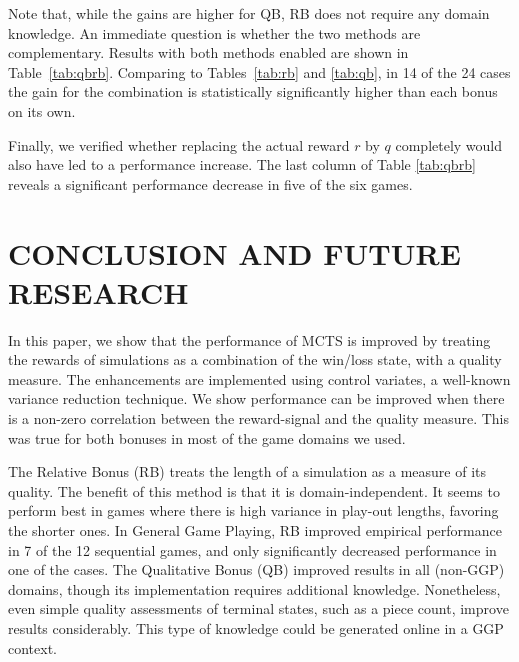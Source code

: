 \documentclass{ecai2014}
\begin{document}
Note that, while the gains are higher for QB, RB does not require any domain knowledge. An immediate question is whether the two methods are complementary. Results with both methods enabled are shown in Table~\ref{tab:qbrb}. Comparing to Tables~\ref{tab:rb} and \ref{tab:qb}, in 14 of the 24 cases the gain for the combination is statistically significantly higher than each bonus on its own. 

Finally, we verified whether replacing the actual reward $r$ by $q$ completely would also have led to a performance increase. The last column of Table \ref{tab:qbrb} reveals a significant performance decrease in five of the six games. 

\section{CONCLUSION AND FUTURE RESEARCH}
\label{sec:concl}
In this paper, we show that the performance of MCTS is improved by treating the rewards of simulations as a combination of the win/loss state, with a quality measure. The enhancements are implemented using control variates, a well-known variance reduction technique. We show performance can be improved when there is a non-zero correlation between the reward-signal and the quality measure. This was true for both bonuses in most of the game domains we used. 

The Relative Bonus (RB) treats the length of a simulation as a measure of its quality. The benefit of this method is that it is domain-independent. It seems to perform best in games where there is high variance in play-out lengths, favoring the shorter ones. 
In General Game Playing, RB improved empirical performance in 7 of the 12 sequential games, 
and only significantly decreased performance in one of the cases. 
The Qualitative Bonus (QB) improved results in all (non-GGP) domains, though its implementation requires additional knowledge. Nonetheless, even simple quality assessments of terminal states, such as a piece count, improve results considerably. This type of knowledge could be generated online in a GGP context. 
\end{document}
